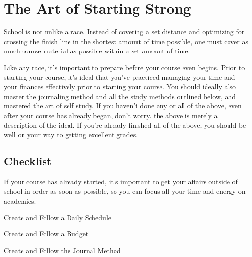 \chapter{The Art of Starting Strong}

School is not unlike a race. Instead of covering a set distance and optimizing for crossing the finish line in the shortest amount of time possible, one must cover as much course material as possible within a set amount of time. 

Like any race, it's important to prepare before your course even begins. Prior to starting your course, it's ideal that you've practiced managing your time and your finances effectively prior to starting your course. You should ideally also master the journaling method and all the study methods outlined below, and mastered the art of self study. If you haven't done any or all of the above, even after your course has already began, don't worry. the above is merely a description of the ideal. If you're already finished all of the above, you should be well on your way to getting excellent grades. 

\section{Checklist}

If your course has already started, it's important to get your affairs outside of school in order as soon as possible, so you can focus all your time and energy on academics. 

\begin{todolist}
\item Create and Follow a Daily Schedule
\item Create and Follow a Budget
\item Create and Follow the Journal Method 
\end{todolist} 
